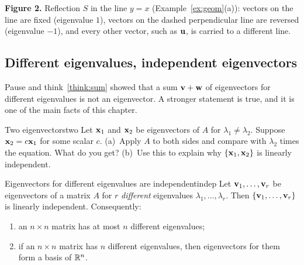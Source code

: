 \documentclass[11pt]{article}
\begin{document}
\noindent\textbf{Figure 2.} Reflection $S$ in the line $y=x$ (Example~\ref{ex:geom}(a)): vectors on the line are fixed (eigenvalue $1$), vectors on the dashed perpendicular line are reversed (eigenvalue $-1$), and every other vector, such as $\mathbf{u}$, is carried to a different line.

\subsection*{Different eigenvalues, independent eigenvectors}

Pause and think~\ref{think:sum} showed that a sum $\mathbf{v}+\mathbf{w}$ of eigenvectors for different eigenvalues is not an eigenvector. A stronger statement is true, and it is one of the main facts of this chapter.

\begin{think}{Two eigenvectors}{two}
Let $\mathbf{x}_1$ and $\mathbf{x}_2$ be eigenvectors of $A$ for $\lambda_1\neq\lambda_2$. Suppose $\mathbf{x}_2=c\mathbf{x}_1$ for some scalar $c$. (a)~Apply $A$ to both sides and compare with $\lambda_2$ times the equation. What do you get? (b)~Use this to explain why $\{\mathbf{x}_1,\mathbf{x}_2\}$ is linearly independent.
\end{think}

\begin{thm}{Eigenvectors for different eigenvalues are independent}{indep}
Let $\mathbf{v}_1,\dots,\mathbf{v}_r$ be eigenvectors of a matrix $A$ for $r$ \emph{different} eigenvalues $\lambda_1,\dots,\lambda_r$. Then $\{\mathbf{v}_1,\dots,\mathbf{v}_r\}$ is linearly independent. Consequently:
\begin{enumerate}[label=(\alph*),itemsep=1pt]
  \item an $n\times n$ matrix has at most $n$ different eigenvalues;
  \item if an $n\times n$ matrix has $n$ different eigenvalues, then eigenvectors for them form a basis of $\mathbb{R}^n$.
\end{enumerate}
\end{thm}
\end{document}

